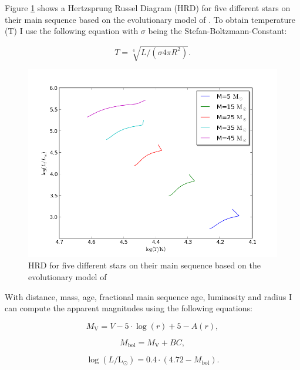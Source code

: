 \documentclass[a4paper,10pt]{article}
\begin{document}
 Figure \ref{lumiradius} shows a Hertzsprung Russel Diagram (HRD) for five different stars on their main sequence based on the evolutionary
 model of \citet{2000MNRAS.315..543H}. To obtain temperature (T) I use the following equation with $\sigma$ being the Stefan-Boltzmann-Constant:
 
 \begin{equation}
  T=\sqrt[4]{L/(\sigma 4 \pi R^2)}.
 \end{equation}
 
  \begin{figure}[h!]
  \includegraphics[width=\textwidth]{lumiradius}
  \caption{HRD for five different stars on their main sequence based on the evolutionary model of \citet{2000MNRAS.315..543H} \label{lumiradius}}
 \end{figure}
 

 With distance, mass, age, fractional main sequence age, luminosity and radius I can  
 compute the apparent magnitudes using the following equations:
 
 \begin{equation}
  M_{\mathrm{V}}=V-5\cdot\log(r)+5-A(r),
  \label{MV}
 \end{equation}
 
 \begin{equation}
  M_{\mathrm{bol}}=M_{\mathrm{V}}+BC,
  \label{Mbol}
 \end{equation}
 
 \begin{equation}
  \log(L/\mathrm{L}_\odot)=0.4\cdot(4.72-M_{\mathrm{bol}}).
  \label{LMbol}
 \end{equation}
 
\end{document}

